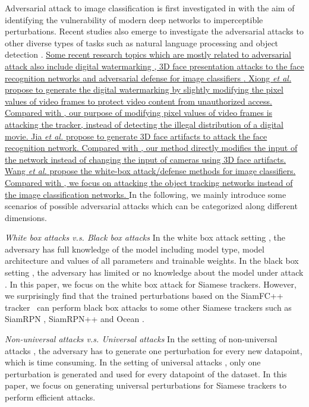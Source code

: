 \documentclass[journal]{IEEEtran}
\begin{document}
Adversarial attack \cite{9169672} to image classification is first investigated in \cite{intriguing} with the aim of identifying the vulnerability of modern deep networks to imperceptible perturbations. 
Recent studies also emerge to investigate the adversarial attacks to other diverse types of tasks such as natural language processing \cite{generating,zhang2020adversarial,morris2020textattack,jin2020bert} and object detection \cite{wei2019transferable}.
\uline{
Some recent research topics which are mostly related to adversarial attack also include digital watermarking \cite{9343885}, 3D face presentation attacks to the face recognition networks \cite{9294085} and adversarial defense for image classifiers \cite{9169672}.
Xiong \textit{et al.} \cite{9343885} propose to generate the digital watermarking by slightly modifying the pixel values of video frames to protect video content from unauthorized access. Compared with \cite{9343885}, our purpose of modifying pixel values of video frames is attacking the tracker, instead of detecting the illegal distribution of a digital movie.
Jia \textit{et al.} \cite{9294085} propose to generate 3D face artifacts to attack the face recognition network. Compared with \cite{9294085}, our method directly modifies the input of the network instead of changing the input of cameras using 3D face artifacts.
Wang \textit{et al.} \cite{9169672} propose the white-box attack/defense methods for image classifiers. Compared with \cite{9169672}, we focus on attacking the object tracking networks instead of the image classification networks.
}
In the following, we mainly introduce some scenarios of possible adversarial attacks which can be categorized along different dimensions.

\textit{White box attacks v.s. Black box attacks} In the white box attack setting \cite{meng2019white}, the adversary has full knowledge of the model including model type, model architecture and values of all parameters and trainable weights. In the black box setting \cite{cheng2018query,li2019nattack,papernot2017practical,li2020projection}, the adversary has limited or no knowledge about the model under attack \cite{kurakin2018adversarial}. In this paper, we focus on the white box attack for Siamese trackers. However, we surprisingly find that the trained perturbations based on the SiamFC++ tracker~\cite{SiamFC++} can perform black box attacks to some other Siamese trackers such as SiamRPN \cite{SiamRPN}, SiamRPN++ \cite{SiamRPN++} and Ocean \cite{zhang2020ocean}.

\textit{Non-universal attacks v.s. Universal attacks} In the setting of non-universal attacks \cite{dai2018adversarial,li2018second,lin2017tactics}, the adversary has to generate one perturbation for every new datapoint, which is time consuming. In the setting of universal attacks \cite{khrulkov2018art,mopuri2018nag,zhang2020understanding,mopuri2018generalizable,chen2018shapeshifter}, only one perturbation is generated and used for every datapoint of the dataset. In this paper, we focus on generating universal perturbations for Siamese trackers to perform efficient attacks.
\end{document}
